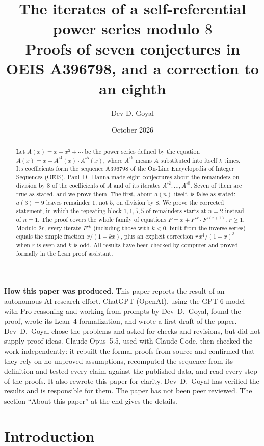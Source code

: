 \documentclass[11pt,a4paper]{article}
\title{The iterates of a self-referential power series modulo $8$\\[6pt]\large Proofs of seven conjectures in OEIS A396798, and a correction to an eighth}
\author{Dev D. Goyal}
\date{October 2026}
\theoremstyle{definition}
\theoremstyle{remark}
\begin{document}
\maketitle
\begin{abstract}
Let $A(x)=x+x^2+\cdots$ be the power series defined by the equation
$A(x)=x+A^{\circ4}(x)\cdot A^{\circ5}(x)$, where $A^{\circ k}$ means $A$ substituted into
itself $k$ times. Its coefficients form the sequence A396798 of the On-Line Encyclopedia of Integer Sequences
(OEIS). Paul~D.~Hanna made eight conjectures about the remainders on division by $8$ of the coefficients of $A$ and of its
iterates $A^{\circ2},\dots,A^{\circ8}$. Seven of them are true as stated, and we prove them. The first, about $a(n)$ itself, is false as
stated: $a(3)=9$ leaves remainder $1$, not $5$, on division by $8$. We prove the corrected statement, in which the
repeating block $1,1,5,5$ of remainders starts at $n=2$ instead of $n=1$. The proof covers the whole family of
equations $F=x+F^{\circ r}\cdot F^{\circ(r+1)}$, $r\ge1$. Modulo $2r$, every iterate $F^{\circ k}$ (including those
with $k<0$, built from the inverse series) equals the simple fraction $x/(1-kx)$, plus an explicit correction
$r\,x^4/(1-x)^3$ when $r$ is even and $k$ is odd. All results have been checked by computer and proved formally in the
Lean proof assistant.
\end{abstract}
\begin{center}\begin{minipage}{0.88\linewidth}\small
\textbf{How this paper was produced.} This paper reports the result of an autonomous AI research effort.
ChatGPT (OpenAI), using the GPT-6 model with Pro reasoning and working from prompts by Dev~D.~Goyal, found the proof, wrote its Lean~4 formalization, and wrote a first draft of the paper.
Dev~D.~Goyal chose the problems and asked for checks and revisions, but did not supply proof ideas.
Claude Opus~5.5, used with Claude Code, then checked the work independently: it rebuilt the formal proofs from
source and confirmed that they rely on no unproved assumptions, recomputed the sequence from its definition and tested
every claim against the published data, and read every step of the proofs. It also rewrote this paper for clarity.
Dev~D.~Goyal has verified the results and is responsible for them. The paper has not been peer reviewed.
The section ``About this paper'' at the end gives the details.
\end{minipage}\end{center}

\section{Introduction}
\end{document}
